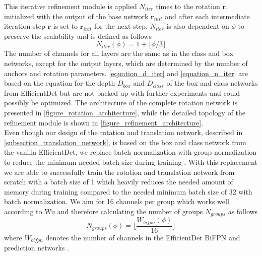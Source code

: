 \documentclass[twocolumn, 10pt, letterpaper]{article}
\begin{document}
This iterative refinement module is applied $N_{iter}$ times to the rotation $\textbf{r}$, initialized with the output of the base network $\textbf{r}_{init}$ and after each intermediate iteration step $\textbf{r}$ is set to $\textbf{r}_{init}$ for the next step. $N_{iter}$ is also dependent on $\phi$ to preserve the scalability and is defined as follows
\begin{equation}
\label{equation_n_iter}
N_{iter}(\phi) = 1 + \lfloor \phi / 3 \rfloor
\end{equation}
The number of channels for all layers are the same as in the class and box networks, except for the output layers, which are determined by the number of anchors and rotation parameters. \autoref{equation_d_iter} and \autoref{equation_n_iter} are based on the equation for the depth $D_{box}$ and $D_{class}$ of the box and class networks from EfficientDet\cite{EfficientDet} but are not backed up with further experiments and could possibly be optimized. The architecture of the complete rotation network is presented in \autoref{figure_rotation_architecture}, while the detailed topology of the refinement module is shown in \autoref{figure_refinement_architecture}.\\

Even though our design of the rotation and translation network, described in \autoref{subsection_translation_network}, is based on the box and class network from the vanilla EfficientDet, we replace batch normalization with group normalization to reduce the minimum needed batch size during training \cite{GroupNorm}. With this replacement we are able to successfully train the rotation and translation network from scratch with a batch size of 1 which heavily reduces the needed amount of memory during training compared to the needed minimum batch size of 32 with batch normalization. We aim for 16 channels per group which works well according to Wu \etal\cite{GroupNorm} and therefore calculating the number of groups $N_{groups}$ as follows
\begin{equation}
\label{equation_num_groups}
N_{groups}(\phi) = \lfloor \frac{W_{bifpn}(\phi)}{16} \rfloor
\end{equation}
where $W_{bifpn}$ denotes the number of channels in the EfficientDet BiFPN and prediction networks \cite{EfficientDet}.
\end{document}
